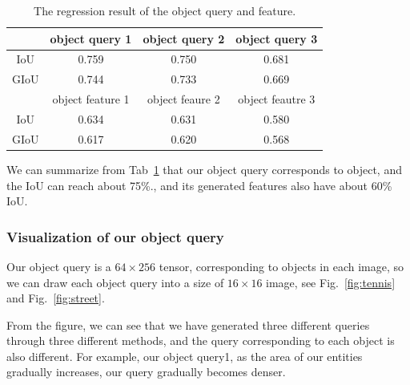 \begin{table}[!h]
	\centering
	\begin{tabular}{c|ccc}
		\bottomrule
		& object query 1 & object query 2 & object query 3  \\ \midrule
		IoU  & 0.759  & 0.750  & 0.681    \\
		GIoU & 0.744  & 0.733 & 0.669   \\ \bottomrule
		&object feature 1  &object feaure 2 & object feautre 3\\ \midrule
		IoU & 0.634 & 0.631 & 0.580 \\
		GIoU	& 0.617 & 0.620 & 0.568  \\\bottomrule
		
	\end{tabular}
\caption[The regression result of the object query and feature]{The regression result of the object query and feature.}
\label{tab:regresstion}
\end{table}

We can summarize from Tab~\ref{tab:regresstion} that our object query corresponds to object, and the IoU can reach about 75\%., and its  generated features also have about 60\%  IoU.

\subsubsection{Visualization of our object query}
Our object query is a $ 64 \times 256 $ tensor, corresponding to objects in each image, so we can draw each object query into a size of $16 \times 16$ image, see Fig.~\ref{fig:tennis} and Fig.~\ref{fig:street}. 

From the figure, we can see that we have generated three different queries through three different methods, and the query corresponding to each object is also different. For example, our object query1, as the area of our entities gradually increases, our query gradually becomes denser. 


